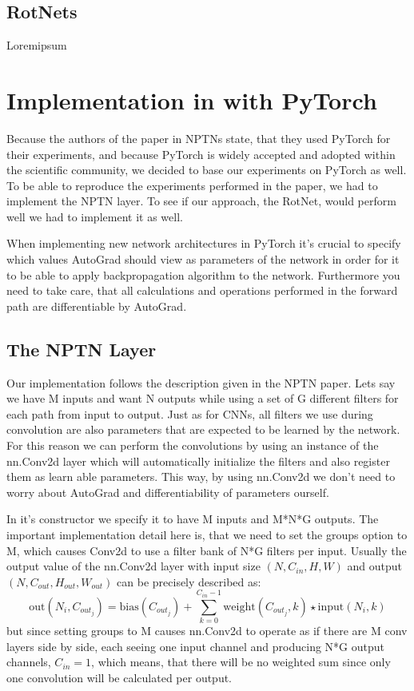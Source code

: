 \documentclass{llncs}
\begin{document}
\subsection{RotNets}
Loremipsum

\section{Implementation in with PyTorch}
Because the authors of the paper in NPTNs state, that they used PyTorch for their experiments, and because PyTorch is widely accepted and adopted within the scientific community, we decided to base our experiments on PyTorch as well.
To be able to reproduce the experiments performed in the paper, we had to implement the NPTN layer. To see if our approach, the RotNet, would perform well we had to implement it as well.

When implementing new network architectures in PyTorch it's crucial to specify which values AutoGrad should view as parameters of the network in order for it to be able to apply backpropagation algorithm to the network. Furthermore you need to take care, that all calculations and operations performed in the forward path are differentiable by AutoGrad.
\subsection{The NPTN Layer}
Our implementation follows the description given in the NPTN paper.
Lets say we have M inputs and want N outputs while using a set of G different filters for each path from input to output.
Just as for CNNs, all filters we use during convolution are also parameters that are expected to be learned by the network.
For this reason we can perform the convolutions by using an instance of the nn.Conv2d layer which will automatically initialize the filters and also register them as learn able parameters. This way, by using nn.Conv2d we don't need to worry about AutoGrad and differentiability of parameters ourself.

In it's constructor we specify it to have M inputs and M*N*G outputs. The important implementation detail here is, that we need to set the groups option to M, which causes Conv2d to use a filter bank of N*G filters per input.
Usually the output value of the nn.Conv2d layer with input size $(N, C_{in}, H, W)$ and output $(N, C_{out}, H_{out}, W_{out})$ can be precisely described as:
\begin{equation*}
\text{out}(N_i, C_{out_j}) = \text{bias}(C_{out_j}) +
\sum_{k = 0}^{C_{in} - 1} \text{weight}(C_{out_j}, k) \star \text{input}(N_i, k)
\end{equation*}
but since setting groups to M causes nn.Conv2d to operate as if there are M conv layers side by side, each seeing one input channel and producing N*G output channels, $C_{in} = 1$, which means, that there will be no weighted sum since only one convolution will be calculated per output.
\end{document}
